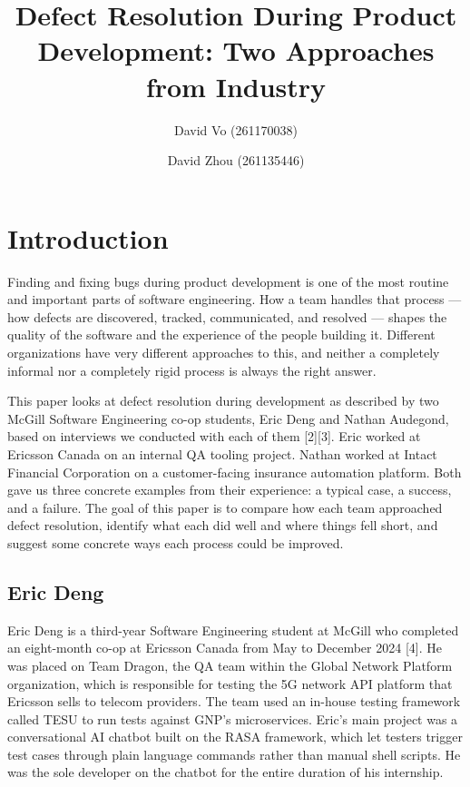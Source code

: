 \documentclass[sigconf]{acmart}
\title{Defect Resolution During Product Development: Two Approaches from Industry}
\author{David Vo (261170038)}
\affiliation{%
  \institution{McGill University}
  \city{Montreal}
  \country{Canada}
}
\author{David Zhou (261135446)}
\affiliation{%
  \institution{McGill University}
  \city{Montreal}
  \country{Canada}
}
\begin{document}
\maketitle

\section{Introduction}

Finding and fixing bugs during product development is one of the most routine and important parts of software engineering. How a team handles that process — how defects are discovered, tracked, communicated, and resolved — shapes the quality of the software and the experience of the people building it. Different organizations have very different approaches to this, and neither a completely informal nor a completely rigid process is always the right answer.

This paper looks at defect resolution during development as described by two McGill Software Engineering co-op students, Eric Deng and Nathan Audegond, based on interviews we conducted with each of them [2][3]. Eric worked at Ericsson Canada on an internal QA tooling project. Nathan worked at Intact Financial Corporation on a customer-facing insurance automation platform. Both gave us three concrete examples from their experience: a typical case, a success, and a failure. The goal of this paper is to compare how each team approached defect resolution, identify what each did well and where things fell short, and suggest some concrete ways each process could be improved.

\subsection{Eric Deng}

Eric Deng is a third-year Software Engineering student at McGill who completed an eight-month co-op at Ericsson Canada from May to December 2024 [4]. He was placed on Team Dragon, the QA team within the Global Network Platform organization, which is responsible for testing the 5G network API platform that Ericsson sells to telecom providers. The team used an in-house testing framework called TESU to run tests against GNP's microservices. Eric's main project was a conversational AI chatbot built on the RASA framework, which let testers trigger test cases through plain language commands rather than manual shell scripts. He was the sole developer on the chatbot for the entire duration of his internship.
\end{document}

